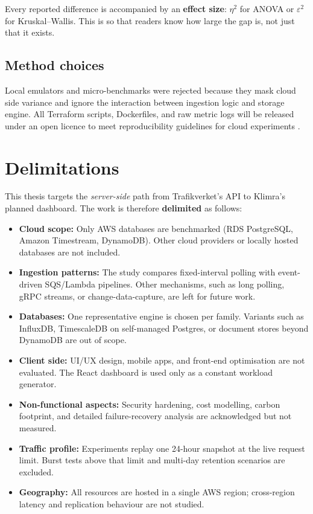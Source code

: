\documentclass[nomenclature, english, biblatex]{kththesis}
\numberwithin{listing}{chapter}
\begin{document}
\noindent
Every reported difference is accompanied by an \textbf{effect size}: $\eta^{2}$ for ANOVA or $\varepsilon^{2}$ for Kruskal–Wallis. This is so that readers know how large the gap is, not just that it exists.


\subsection{Method choices}
Local emulators and micro-benchmarks were rejected because they mask cloud side variance and ignore the interaction between ingestion logic and storage engine. All Terraform scripts, Dockerfiles, and raw metric logs will be released under an open licence to meet reproducibility guidelines for cloud experiments \cite{PerformanceEvaluationMetrics}.






\section{Delimitations}
\label{sec:delimitations}
This thesis targets the \emph{server-side} path from Trafikverket's API to Klimra's planned dashboard. The work is therefore \textbf{delimited} as follows:

\begin{itemize}[noitemsep,leftmargin=*]
  \item \textbf{Cloud scope:} Only AWS databases are benchmarked (RDS PostgreSQL, Amazon Timestream, DynamoDB). Other cloud providers or locally hosted databases are not included.

  \item \textbf{Ingestion patterns:} The study compares fixed-interval polling with event-driven SQS/Lambda pipelines. Other mechanisms, such as long polling, gRPC streams, or change-data-capture, are left for future work.

  \item \textbf{Databases:} One representative engine is chosen per family. Variants such as InfluxDB, TimescaleDB on self-managed Postgres, or document stores beyond DynamoDB are out of scope.

  \item \textbf{Client side:} UI/UX design, mobile apps, and front-end optimisation are not evaluated. The React dashboard is used only as a constant workload generator.

  \item \textbf{Non-functional aspects:} Security hardening, cost modelling, carbon footprint, and detailed failure-recovery analysis are acknowledged but not measured.

  \item \textbf{Traffic profile:} Experiments replay one 24-hour snapshot at the live request limit. Burst tests above that limit and multi-day retention scenarios are excluded.

  \item \textbf{Geography:} All resources are hosted in a single AWS region; cross-region latency and replication behaviour are not studied.
\end{itemize}
\end{document}
